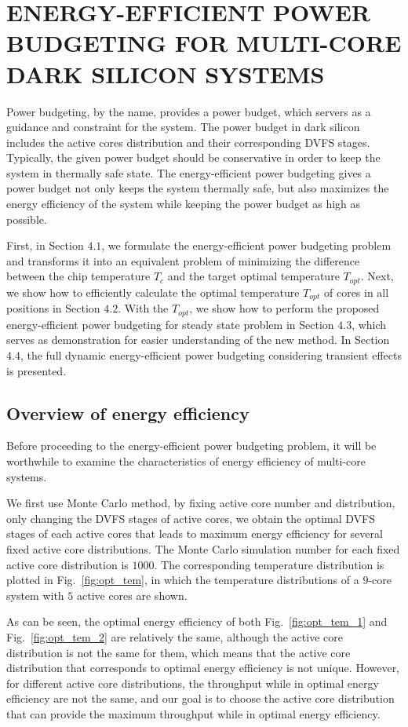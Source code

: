 \section{ENERGY-EFFICIENT POWER BUDGETING FOR MULTI-CORE DARK SILICON SYSTEMS}

Power budgeting, by the name, provides a power budget, which servers as a guidance and constraint for the system. The power budget in dark silicon includes the active cores distribution and their corresponding DVFS stages. Typically, the given power budget should be conservative in order to keep the system in thermally safe state. The energy-efficient power budgeting gives a power budget not only keeps the system thermally safe, but also maximizes the energy efficiency of the system while keeping the power budget as high as possible. 

First, in Section $4.1$, we formulate the energy-efficient power budgeting problem and transforms it into an equivalent problem of minimizing the difference between the chip temperature $T_{c}$ and the target optimal temperature $T_{opt}$. Next, we show how to efficiently calculate the optimal temperature $T_{opt}$ of cores in all positions in Section $4.2$. With the $T_{opt}$, we show how to perform the proposed energy-efficient power budgeting for steady state problem in Section $4.3$, which serves as demonstration for easier understanding of the new method. In Section $4.4$, the full dynamic energy-efficient power budgeting considering transient effects is presented.


\subsection{Overview of energy efficiency}
Before proceeding to the energy-efficient power budgeting problem, it will be worthwhile to examine the characteristics of energy efficiency of multi-core systems.

We first use Monte Carlo method, by fixing active core number and distribution, only changing the DVFS stages of active cores, we obtain the optimal DVFS stages of each active cores that leads to maximum energy efficiency for several fixed active core distributions. The Monte Carlo simulation number for each fixed active core distribution is $1000$. The corresponding temperature distribution is plotted in Fig.~\ref{fig:opt_tem}, in which the temperature distributions of a $9$-core system with $5$ active cores are shown. 

As can be seen, the optimal energy efficiency of both Fig.~\ref{fig:opt_tem_1} and Fig.~\ref{fig:opt_tem_2} are relatively the same, although the active core distribution is not the same for them, which means that the active core distribution that corresponds to optimal energy efficiency is not unique. However, for different active core distributions, the throughput while in optimal energy efficiency are not the same, and our goal is to choose the active core distribution that can provide the maximum throughput while in optimal energy efficiency.


